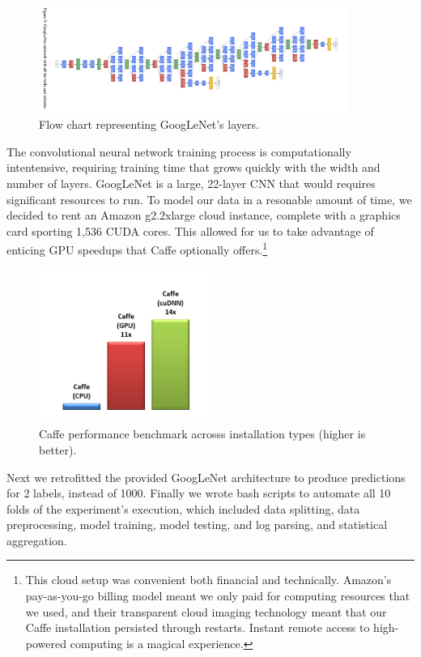 \documentclass[midd]{thesis}
\begin{document}
\begin{figure}[h]
\centering
\includegraphics[width=0.9\textwidth]{figures/googlenet.png}
\caption{Flow chart representing GoogLeNet's layers.}
\label{fig:googlenet}
\end{figure}

The convolutional neural network training process is computationally intentensive, requiring training time that grows quickly with the width and number of layers. GoogLeNet is a large, 22-layer CNN that would requires significant resources to run. To model our data in a resonable amount of time, we decided to rent an Amazon g2.2xlarge cloud instance, complete with a graphics card sporting 1,536 CUDA cores. This allowed for us to take advantage of enticing GPU speedups that Caffe optionally offers.\footnote{This cloud setup was convenient both financial and technically. Amazon's pay-as-you-go billing model meant we only paid for computing resources that we used, and their transparent cloud imaging technology meant that our Caffe installation persisted through restarts. Instant remote access to high-powered computing is a magical experience.}

\begin{figure}[h]
\centering
\includegraphics[width=0.5\textwidth]{visualizations/caffe-performance.png}
\caption{Caffe performance benchmark acrosss installation types (higher is better).}
\label{fig:caffebenchmark}
\end{figure}


Next we retrofitted the provided GoogLeNet architecture to produce predictions for 2 labels, instead of 1000. Finally we wrote bash scripts to automate all 10 folds of the experiment's execution, which included data splitting, data preprocessing, model training, model testing, and log parsing, and statistical aggregation.
\end{document}
